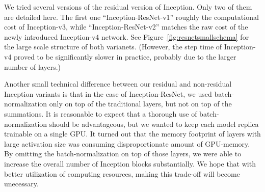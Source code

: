 We tried several versions of the residual version of Inception. Only two
of them are detailed here. The first one ``Inception-ResNet-v1''
roughly the computational cost of Inception-v3, while ``Inception-ResNet-v2''
matches the raw cost of the newly introduced Inception-v4 network. See
Figure~\ref{fig:resnetsmallschema} for the large scale structure of both
varianets. (However, the step time of Inception-v4 proved to be significantly
slower in practice, probably due to the larger number of layers.)

Another small technical difference between our residual and non-residual
Inception variants is that in the case of Inception-ResNet,
we used batch-normalization only on top of the traditional layers, but not
on top of the summations. It is reasonable to expect that a thorough use
of batch-normalization should be advantageous, but we wanted to keep
each model replica trainable on a single GPU. It turned out that the
memory footprint of layers with large activation size was consuming
disproportionate amount of GPU-memory. By omitting the batch-normalization
on top of those layers, we were able to increase the overall number of
Inception blocks substantially. We hope that with better utilization of
computing resources, making this trade-off will become unecessary.

